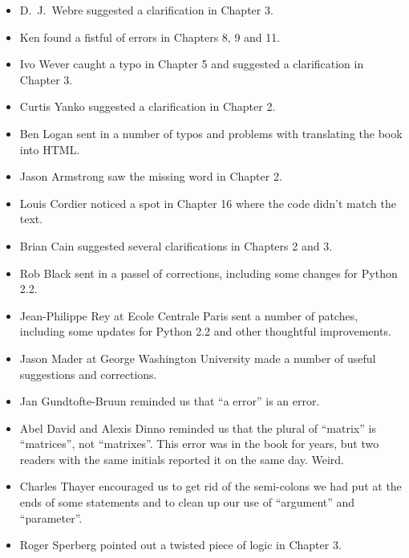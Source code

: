 \documentclass[10pt]{book}
\begin{document}
\begin{itemize}
\item D.~J.~Webre suggested a clarification in Chapter 3.

\item Ken found a fistful of errors in Chapters 8, 9 and 11.

\item Ivo Wever caught a typo in Chapter 5 and suggested a clarification
in Chapter 3.

\item Curtis Yanko suggested a clarification in Chapter 2.

\item Ben Logan sent in a number of typos and problems with translating
the book into HTML.

\item Jason Armstrong saw the missing word in Chapter 2.

\item Louis Cordier noticed a spot in Chapter 16 where the code
didn't match the text.

\item Brian Cain suggested several clarifications in Chapters 2 and 3.

\item Rob Black sent in a passel of corrections, including some
changes for Python 2.2.

\item Jean-Philippe Rey at Ecole Centrale
Paris sent a number of patches, including some updates for Python 2.2
and other thoughtful improvements.

\item Jason Mader at George Washington University made a number
of useful suggestions and corrections.

\item Jan Gundtofte-Bruun reminded us that ``a error'' is an error.

\item Abel David and Alexis Dinno reminded us that the plural of
``matrix'' is ``matrices'', not ``matrixes''.  This error was in the
book for years, but two readers with the same initials reported it on
the same day.  Weird.

\item Charles Thayer encouraged us to get rid of the semi-colons
we had put at the ends of some statements and to clean up our
use of ``argument'' and ``parameter''.

\item Roger Sperberg pointed out a twisted piece of logic in Chapter 3.


\end{itemize}
\end{document}
